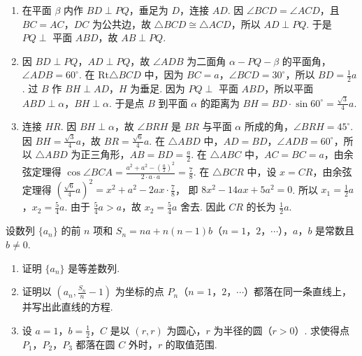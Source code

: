 \documentclass[UTF8,a4paper,oneside,11pt]{ctexbook}
\begin{document}
\begin{solution}
\begin{enumerate}
\item 在平面 \(\beta\) 内作 \(BD \perp PQ\)，垂足为 \(D\)，连接 \(AD\). 因 \(\angle BCD = \angle ACD\)，且 \(BC = AC\)，\(DC\) 为公共边，故 \(\triangle BCD \cong \triangle ACD\)，所以 \(AD \perp PQ\). 于是 \(PQ \perp\) 平面 \(ABD\)，故 \(AB \perp PQ\).

\item 因 \(BD \perp PQ\)，\(AD \perp PQ\)，故 \(\angle ADB\) 为二面角 \(\alpha - PQ - \beta\) 的平面角，\(\angle ADB = 60^{\circ}\). 在 \(\mathrm{Rt}\triangle BCD\) 中，因为 \(BC = a\)，\(\angle BCD = 30^{\circ}\)，所以 \(BD = \frac{1}{2}a\). 过 \(B\) 作 \(BH \perp AD\)，\(H\) 为垂足. 因为 \(PQ \perp\) 平面 \(ABD\)，所以平面 \(ABD \perp \alpha\)，\(BH \perp \alpha\). 于是点 \(B\) 到平面 \(\alpha\) 的距离为 \(BH = BD \cdot \sin 60^{\circ} = \frac{\sqrt{3}}{4}a\).

\item 连接 \(HR\). 因 \(BH \perp \alpha\)，故 \(\angle BRH\) 是 \(BR\) 与平面 \(\alpha\) 所成的角，\(\angle BRH = 45^{\circ}\). 因 \(BH = \frac{\sqrt{3}}{4}a\)，故 \(BR = \frac{\sqrt{6}}{4}a\). 在 \(\triangle ABD\) 中，\(AD = BD\)，\(\angle ADB = 60^{\circ}\)，所以 \(\triangle ABD\) 为正三角形，\(AB = BD = \frac{a}{2}\). 在 \(\triangle ABC\) 中，\(AC = BC = a\)，由余弦定理得 \(\cos \angle BCA = \frac{a^2 + a^2 - \left(\frac{a}{2}\right)^2}{2 \cdot a \cdot a} = \frac{7}{8}\).
在 \(\triangle BCR\) 中，设 \(x = CR\)，由余弦定理得 \(\left(\frac{\sqrt{6}}{4}a\right)^2 = x^2 + a^2 - 2ax \cdot \frac{7}{8}\)，
即 \(8x^2 - 14ax + 5a^2 = 0\). 所以 \(x_1 = \frac{1}{2}a\)，\(x_2 = \frac{5}{4}a\).
由于 \(\frac{5}{4}a > a\)，故 \(x_2 = \frac{5}{4}a\) 舍去. 因此 \(CR\) 的长为 \(\frac{1}{2}a\).
\end{enumerate}
\end{solution}

\begin{problem}
设数列 \(\{a_n\}\) 的前 \(n\) 项和 \(S_n = na + n(n - 1)b\)（\(n = 1\)，\(2\)，\(\cdots\)），\(a\)，\(b\) 是常数且 \(b \neq 0\).

\begin{enumerate}
\item 证明 \(\{a_n\}\) 是等差数列.
\item 证明以 \(\left(a_n, \frac{S_n}{n} - 1\right)\) 为坐标的点 \(P_n\)（\(n = 1\)，\(2\)，\(\cdots\)）都落在同一条直线上，并写出此直线的方程.
\item 设 \(a = 1\)，\(b = \frac{1}{2}\)，\(C\) 是以 \((r,r)\) 为圆心，\(r\) 为半径的圆（\(r > 0\)）. 求使得点 \(P_1\)，\(P_2\)，\(P_3\) 都落在圆 \(C\) 外时，\(r\) 的取值范围.
\end{enumerate}
\end{problem}
\end{document}
